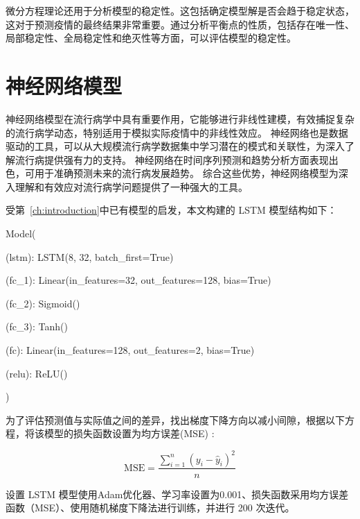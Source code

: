 微分方程理论还用于分析模型的稳定性。这包括确定模型解是否会趋于稳定状态，这对于预测疫情的最终结果非常重要。通过分析平衡点的性质，包括存在唯一性、局部稳定性、全局稳定性和绝灭性等方面，可以评估模型的稳定性。


\section{神经网络模型}

神经网络模型在流行病学中具有重要作用，它能够进行非线性建模，有效捕捉复杂的流行病学动态，特别适用于模拟实际疫情中的非线性效应。
神经网络也是数据驱动的工具，可以从大规模流行病学数据集中学习潜在的模式和关联性，为深入了解流行病提供强有力的支持。
神经网络在时间序列预测和趋势分析方面表现出色，可用于准确预测未来的流行病发展趋势。
综合这些优势，神经网络模型为深入理解和有效应对流行病学问题提供了一种强大的工具。

受第~\ref{ch:introduction}中已有模型的启发，本文构建的 LSTM 模型结构如下：

\begin{algorithm}
	\label{alg:algorithm}
	Model(

	\qquad (lstm): LSTM(8, 32, batch\_first=True)

	\qquad (fc\_1): Linear(in\_features=32, out\_features=128, bias=True)

	\qquad (fc\_2): Sigmoid()

	\qquad (fc\_3): Tanh()

	\qquad (fc): Linear(in\_features=128, out\_features=2, bias=True)

	\qquad (relu): ReLU()

	)
\end{algorithm}

为了评估预测值与实际值之间的差异，找出梯度下降方向以减小间隙，根据以下方程，将该模型的损失函数设置为均方误差(MSE) :

\begin{equation*}
	\text{MSE}=\frac{\sum_{i=1}^n\left(y_i-\hat{y}_i\right)^2}{n}
\end{equation*}

设置 LSTM 模型使用Adam优化器、学习率设置为0.001、损失函数采用均方误差函数（MSE）、使用随机梯度下降法进行训练，并进行 200 次迭代。